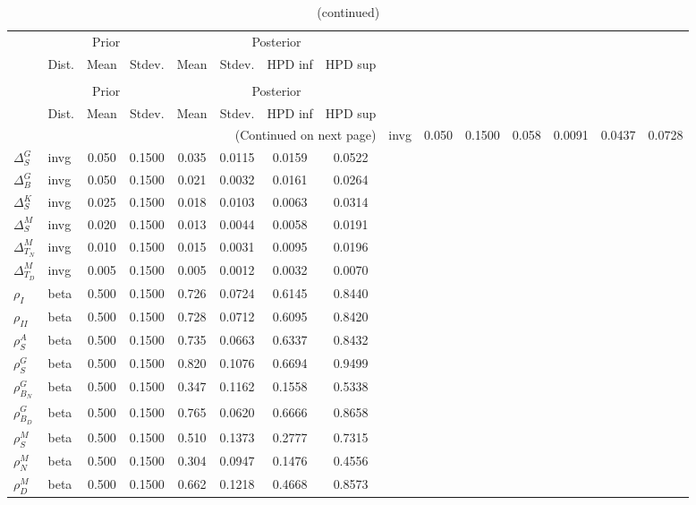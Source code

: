  
\begin{center}
\begin{longtable}{llcccccc} 
\caption{Results from Metropolis-Hastings (parameters)}
 \label{Table:MHPosterior:1}\\
\toprule 
  & \multicolumn{3}{c}{Prior}  &  \multicolumn{4}{c}{Posterior} \\
  \cmidrule(r{.75em}){2-4} \cmidrule(r{.75em}){5-8}
  & Dist. & Mean  & Stdev. & Mean & Stdev. & HPD inf & HPD sup\\
\midrule \endfirsthead 
\caption{(continued)}\\\toprule 
  & \multicolumn{3}{c}{Prior}  &  \multicolumn{4}{c}{Posterior} \\
  \cmidrule(r{.75em}){2-4} \cmidrule(r{.75em}){5-8}
  & Dist. & Mean  & Stdev. & Mean & Stdev. & HPD inf & HPD sup\\
\midrule \endhead 
\bottomrule \multicolumn{8}{r}{(Continued on next page)} \endfoot 
\bottomrule \endlastfoot 
${\Delta^{A}_{S}}$ & invg &   0.050 & 0.1500 &   0.058& 0.0091 &  0.0437 &  0.0728 \\ 
${\Delta^{G}_{S}}$ & invg &   0.050 & 0.1500 &   0.035& 0.0115 &  0.0159 &  0.0522 \\ 
${\Delta^{G}_{B}}$ & invg &   0.050 & 0.1500 &   0.021& 0.0032 &  0.0161 &  0.0264 \\ 
${\Delta^{K}_{S}}$ & invg &   0.025 & 0.1500 &   0.018& 0.0103 &  0.0063 &  0.0314 \\ 
${\Delta^{M}_{S}}$ & invg &   0.020 & 0.1500 &   0.013& 0.0044 &  0.0058 &  0.0191 \\ 
${\Delta^{M}_{T_N}}$ & invg &   0.010 & 0.1500 &   0.015& 0.0031 &  0.0095 &  0.0196 \\ 
${\Delta^{M}_{T_D}}$ & invg &   0.005 & 0.1500 &   0.005& 0.0012 &  0.0032 &  0.0070 \\ 
${\rho_{I}}$ & beta &   0.500 & 0.1500 &   0.726& 0.0724 &  0.6145 &  0.8440 \\ 
${\rho_{II}}$ & beta &   0.500 & 0.1500 &   0.728& 0.0712 &  0.6095 &  0.8420 \\ 
${\rho^{A}_{S}}$ & beta &   0.500 & 0.1500 &   0.735& 0.0663 &  0.6337 &  0.8432 \\ 
${\rho^{G}_{S}}$ & beta &   0.500 & 0.1500 &   0.820& 0.1076 &  0.6694 &  0.9499 \\ 
${\rho^{G}_{B_N}}$ & beta &   0.500 & 0.1500 &   0.347& 0.1162 &  0.1558 &  0.5338 \\ 
${\rho^{G}_{B_D}}$ & beta &   0.500 & 0.1500 &   0.765& 0.0620 &  0.6666 &  0.8658 \\ 
${\rho^{M}_{S}}$ & beta &   0.500 & 0.1500 &   0.510& 0.1373 &  0.2777 &  0.7315 \\ 
${\rho^{M}_{N}}$ & beta &   0.500 & 0.1500 &   0.304& 0.0947 &  0.1476 &  0.4556 \\ 
${\rho^{M}_{D}}$ & beta &   0.500 & 0.1500 &   0.662& 0.1218 &  0.4668 &  0.8573 \\ 
\end{longtable}
 \end{center}

